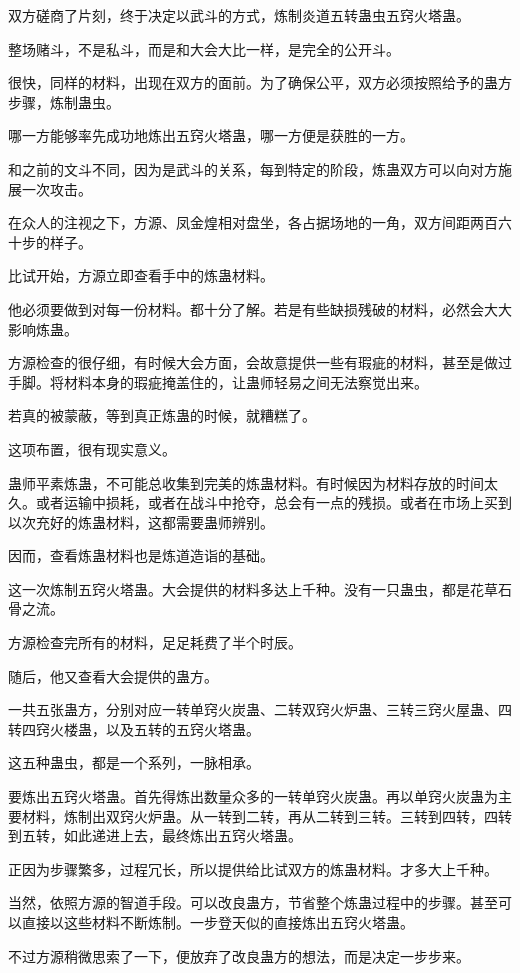 \begin{this_body}
双方磋商了片刻，终于决定以武斗的方式，炼制炎道五转蛊虫五窍火塔蛊。

整场赌斗，不是私斗，而是和大会大比一样，是完全的公开斗。

很快，同样的材料，出现在双方的面前。为了确保公平，双方必须按照给予的蛊方步骤，炼制蛊虫。

哪一方能够率先成功地炼出五窍火塔蛊，哪一方便是获胜的一方。

和之前的文斗不同，因为是武斗的关系，每到特定的阶段，炼蛊双方可以向对方施展一次攻击。

在众人的注视之下，方源、凤金煌相对盘坐，各占据场地的一角，双方间距两百六十步的样子。

比试开始，方源立即查看手中的炼蛊材料。

他必须要做到对每一份材料。都十分了解。若是有些缺损残破的材料，必然会大大影响炼蛊。

方源检查的很仔细，有时候大会方面，会故意提供一些有瑕疵的材料，甚至是做过手脚。将材料本身的瑕疵掩盖住的，让蛊师轻易之间无法察觉出来。

若真的被蒙蔽，等到真正炼蛊的时候，就糟糕了。

这项布置，很有现实意义。

蛊师平素炼蛊，不可能总收集到完美的炼蛊材料。有时候因为材料存放的时间太久。或者运输中损耗，或者在战斗中抢夺，总会有一点的残损。或者在市场上买到以次充好的炼蛊材料，这都需要蛊师辨别。

因而，查看炼蛊材料也是炼道造诣的基础。

这一次炼制五窍火塔蛊。大会提供的材料多达上千种。没有一只蛊虫，都是花草石骨之流。

方源检查完所有的材料，足足耗费了半个时辰。

随后，他又查看大会提供的蛊方。

一共五张蛊方，分别对应一转单窍火炭蛊、二转双窍火炉蛊、三转三窍火屋蛊、四转四窍火楼蛊，以及五转的五窍火塔蛊。

这五种蛊虫，都是一个系列，一脉相承。

要炼出五窍火塔蛊。首先得炼出数量众多的一转单窍火炭蛊。再以单窍火炭蛊为主要材料，炼制出双窍火炉蛊。从一转到二转，再从二转到三转。三转到四转，四转到五转，如此递进上去，最终炼出五窍火塔蛊。

正因为步骤繁多，过程冗长，所以提供给比试双方的炼蛊材料。才多大上千种。

当然，依照方源的智道手段。可以改良蛊方，节省整个炼蛊过程中的步骤。甚至可以直接以这些材料不断炼制。一步登天似的直接炼出五窍火塔蛊。

不过方源稍微思索了一下，便放弃了改良蛊方的想法，而是决定一步步来。


\end{this_body}
